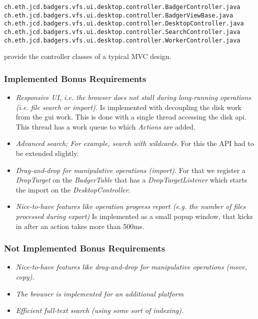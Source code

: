 \begin{verbatim}
ch.eth.jcd.badgers.vfs.ui.desktop.controller.BadgerController.java
ch.eth.jcd.badgers.vfs.ui.desktop.controller.BadgerViewBase.java
ch.eth.jcd.badgers.vfs.ui.desktop.controller.DesktopController.java
ch.eth.jcd.badgers.vfs.ui.desktop.controller.SearchController.java
ch.eth.jcd.badgers.vfs.ui.desktop.controller.WorkerController.java
\end{verbatim} provide the controller classes of a typical MVC design. 


\subsubsection {Implemented Bonus Requirements}
\begin{itemize}
  \item \emph{Responsive UI, i.e. the browser does not stall during long-running
  operations (i.e. file search or import).} Is implemented with decoupling the
  disk work from the gui work. This is done with a single thread accessing the
  disk api. This thread has a work queue to which \textit{Actions} are added.
  \item \emph{Advanced search; For example, search with wildcards.} For this the
  API had to be extended slightly.
  \item \emph{Drag-and-drop for manipulative operations (import).} For that we
  register a \textit{DropTarget} on the \textit{BadgerTable} that has a
  \textit{DropTargetListener} which starts the import on the
  \textit{DesktopController}.
  \item \emph{Nice-to-have features like operation progress report (e.g. the
  number of files processed during export)} Is implemented as a small popup
  window, that kicks in after an action takes more than 500ms.
\end{itemize}

\subsubsection {Not Implemented Bonus Requirements}
\begin{itemize}
  \item \emph{Nice-to-have features like drag-and-drop for manipulative
  operations (move, copy).}
  \item \emph{The browser is implemented for an additional platform}
  \item \emph{Efficient full-text search (using some sort of indexing).}
\end{itemize}

